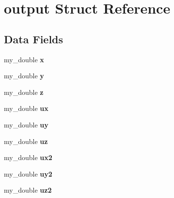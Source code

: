 \hypertarget{structoutput}{\section{output Struct Reference}
\label{structoutput}
}
\subsection*{Data Fields}
\begin{DoxyCompactItemize}
\item 
\hypertarget{structoutput_a6fbf971dfa3e1c85a7a34f28b50e0a51}{my\-\_\-double {\bfseries x}}\label{structoutput_a6fbf971dfa3e1c85a7a34f28b50e0a51}

\item 
\hypertarget{structoutput_ac8ec421ee9860bb83e08c449bd7b2557}{my\-\_\-double {\bfseries y}}\label{structoutput_ac8ec421ee9860bb83e08c449bd7b2557}

\item 
\hypertarget{structoutput_a6492ac674a1db1a8278581ce20e4d8bc}{my\-\_\-double {\bfseries z}}\label{structoutput_a6492ac674a1db1a8278581ce20e4d8bc}

\item 
\hypertarget{structoutput_a19af66cd0753eca2c83676ad2521fb38}{my\-\_\-double {\bfseries ux}}\label{structoutput_a19af66cd0753eca2c83676ad2521fb38}

\item 
\hypertarget{structoutput_a6e8a5288cb9f682e6789c49547c03bdb}{my\-\_\-double {\bfseries uy}}\label{structoutput_a6e8a5288cb9f682e6789c49547c03bdb}

\item 
\hypertarget{structoutput_affb729b129699553b7623e508b9693a7}{my\-\_\-double {\bfseries uz}}\label{structoutput_affb729b129699553b7623e508b9693a7}

\item 
\hypertarget{structoutput_a6367cdbb260ee062dd60ad7a198b64b3}{my\-\_\-double {\bfseries ux2}}\label{structoutput_a6367cdbb260ee062dd60ad7a198b64b3}

\item 
\hypertarget{structoutput_a3239e51c27268de6a9fded3c7a308b74}{my\-\_\-double {\bfseries uy2}}\label{structoutput_a3239e51c27268de6a9fded3c7a308b74}

\item 
\hypertarget{structoutput_a2fd5b62f26e48af771911136aa496a7e}{my\-\_\-double {\bfseries uz2}}\label{structoutput_a2fd5b62f26e48af771911136aa496a7e}


\end{DoxyCompactItemize}
